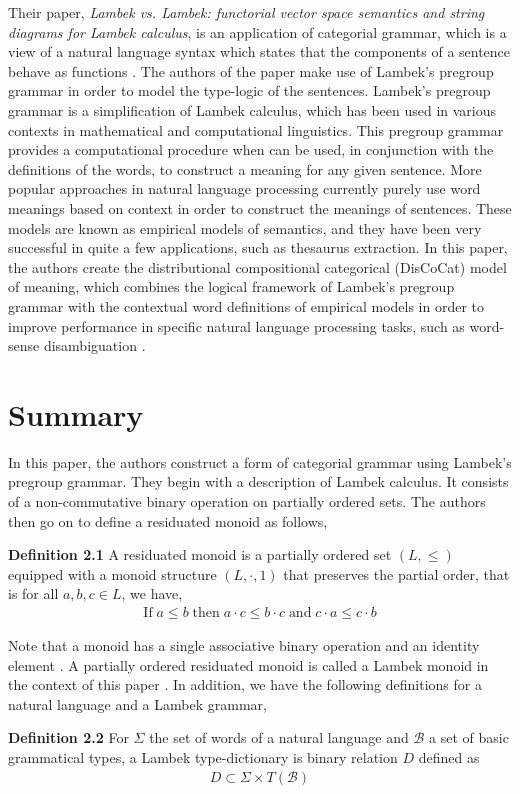 \documentclass[11pt, reqno]{amsart}
\theoremstyle{plain}
\theoremstyle{definition}
\theoremstyle{example}
\begin{document}
\par
Their paper, \textit{Lambek vs. Lambek: functorial vector space semantics and string diagrams for Lambek calculus}, is an application of categorial grammar, which is a view of a natural language syntax which states that the components of a sentence behave as functions \cite{categorialgrammar}. The authors of the paper make use of Lambek's pregroup grammar in order to model the type-logic of the sentences. Lambek's pregroup grammar is a simplification of Lambek calculus, which has been used in various contexts in mathematical and computational linguistics. This pregroup grammar provides a computational procedure when can be used, in conjunction with the definitions of the words, to construct a meaning for any given sentence. More popular approaches in natural language processing currently purely use word meanings based on context in order to construct the meanings of sentences. These models are known as empirical models of semantics, and they have been very successful in quite a few applications, such as thesaurus extraction. In this paper, the authors create the distributional compositional categorical (DisCoCat) model of meaning, which combines the logical framework of Lambek's pregroup grammar with the contextual word definitions of empirical models in order to improve performance in specific natural language processing tasks, such as word-sense disambiguation \cite{lambekvlambek}.
\newpage
\section{Summary}

In this paper, the authors construct a form of categorial grammar using Lambek's pregroup grammar. They begin with a description of Lambek calculus. It consists of a non-commutative binary operation on partially ordered sets. The authors then go on to define a residuated monoid as follows,

\par
\textbf{Definition 2.1} \cite{lambekvlambek} A residuated monoid is a partially ordered set $(L, \leq)$ equipped with a monoid structure $(L, \cdot, 1)$ that preserves the partial order, that is for all $a, b, c \in L$, we have,
\begin{align*}
\text{If} \; a \leq b \; \text{then} \; a \cdot c \leq b \cdot c \; \text{and} \; c \cdot a \leq c \cdot b
\end{align*}

Note that a monoid has a single associative binary operation and an identity element \cite{monoid}. A partially ordered residuated monoid is called a Lambek monoid in the context of this paper \cite{lambekvlambek}. In addition, we have the following definitions for a natural language and a Lambek grammar,
\par
\textbf{Definition 2.2} \cite{lambekvlambek} For $\Sigma$ the set of words of a natural language and $\mathcal{B}$ a set of basic grammatical types, a Lambek type-dictionary is binary relation $D$ defined as
\begin{align*}
D \subset \Sigma \times T(\mathcal{B})
\end{align*}
\end{document}
